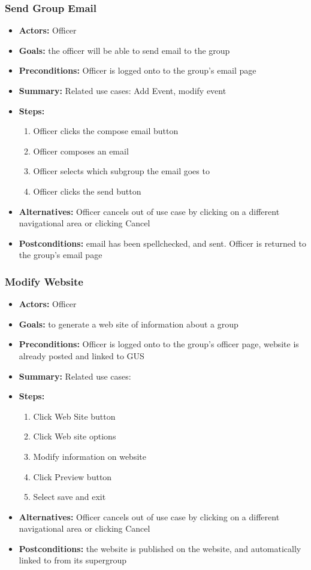 			\subsubsection{Send Group Email}
			\begin{itemize}
				\item{\textbf{Actors:} Officer}
				\item{\textbf{Goals:} the officer will be able to send email to the group}
				\item{\textbf{Preconditions:} Officer is logged onto to the group's email page}
				\item{\textbf{Summary:} Related use cases: Add Event, modify event}
				\item{\textbf{Steps:}
				\begin{enumerate}
					\item{Officer clicks the compose email button}
					\item{Officer composes an email}
					\item{Officer selects which subgroup the email goes to}
					\item{Officer clicks the send button}
				\end{enumerate}
				}
				\item{\textbf{Alternatives:} Officer cancels out of use case by clicking on a different navigational area or clicking Cancel}
				\item{\textbf{Postconditions:} email has been spellchecked, and sent.  Officer is returned to the group's email page}
			\end{itemize}
			\subsubsection{Modify Website}
			\begin{itemize}
				\item{\textbf{Actors:} Officer}
				\item{\textbf{Goals:}  to generate a web site of information about a group}
				\item{\textbf{Preconditions:} Officer is logged onto to the group's officer page, website is already posted and linked to GUS}
				\item{\textbf{Summary:} Related use cases: }
				\item{\textbf{Steps:}
				\begin{enumerate}
					\item{Click Web Site button}
					\item{Click Web site options}
					\item{Modify information on website}
					\item{Click Preview button}
					\item{Select save and exit}

				\end{enumerate}
				}
				\item{\textbf{Alternatives:} Officer cancels out of use case by clicking on a different navigational area or clicking Cancel}
				\item{\textbf{Postconditions:} the website is published on the website, and automatically linked to from its supergroup
}
			\end{itemize}
